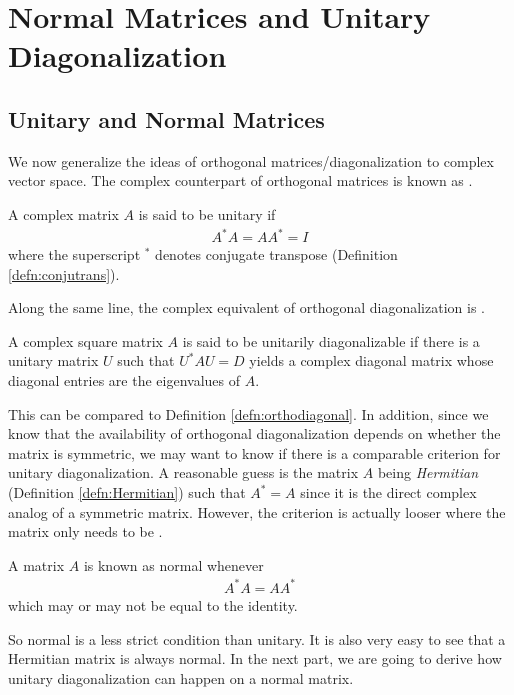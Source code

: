 \section{Normal Matrices and Unitary Diagonalization}

\subsection{Unitary and Normal Matrices} 
We now generalize the ideas of orthogonal matrices/diagonalization to complex vector space. The complex counterpart of orthogonal matrices is known as .
\begin{defn}
\label{defn:unitary}
A complex matrix $A$ is said to be unitary if
\begin{align}
A^*A = AA^* = I
\end{align}
where the superscript $^*$ denotes conjugate transpose (Definition \ref{defn:conjutrans}).
\end{defn}
Along the same line, the complex equivalent of orthogonal diagonalization is .
\begin{defn}
\label{defn:unitarydiag}
A complex square matrix $A$ is said to be unitarily diagonalizable if there is a unitary matrix $U$ such that $U^* AU = D$ yields a complex diagonal matrix whose diagonal entries are the eigenvalues of $A$.
\end{defn}
This can be compared to Definition \ref{defn:orthodiagonal}. In addition, since we know that the availability of orthogonal diagonalization depends on whether the matrix is symmetric, we may want to know if there is a comparable criterion for unitary diagonalization. A reasonable guess is the matrix $A$ being \textit{Hermitian} (Definition \ref{defn:Hermitian}) such that $A^* = A$ since it is the direct complex analog of a symmetric matrix. However, the criterion is actually looser where the matrix only needs to be .
\begin{defn}
A matrix $A$ is known as normal whenever
\begin{align}
A^*A = AA^*    
\end{align}
which may or may not be equal to the identity.
\end{defn}
So normal is a less strict condition than unitary. It is also very easy to see that a Hermitian matrix is always normal. In the next part, we are going to derive how unitary diagonalization can happen on a normal matrix.

